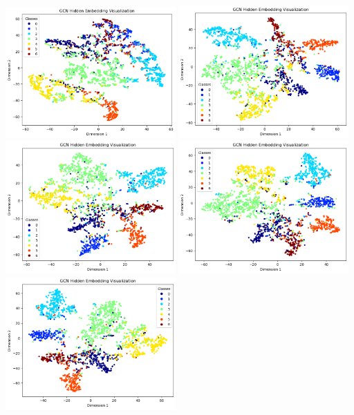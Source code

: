 \documentclass[11pt]{scrartcl}
\begin{document}
\begin{enumerate}[(a)]
\begin{center}
        \includegraphics[width=6.5cm]{hw2-img/hw2-p4-d4.png}
        \includegraphics[width=6.5cm]{hw2-img/hw2-p4-d8.png}
        \includegraphics[width=6.5cm]{hw2-img/hw2-p4-d16.png}
        \includegraphics[width=6.5cm]{hw2-img/hw2-p4-d32.png}
        \includegraphics[width=6.5cm]{hw2-img/hw2-p4-d64.png}

\end{center}
\end{enumerate}
\end{document}
